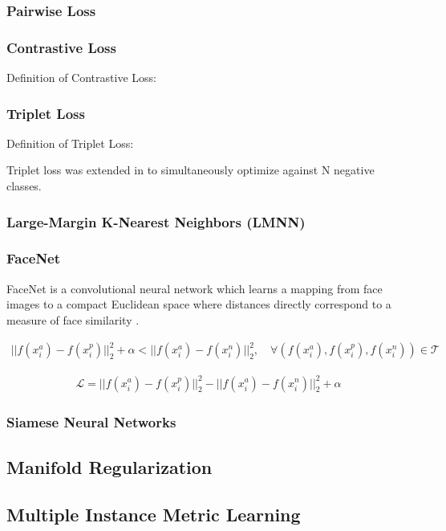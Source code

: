 	\subsubsection{Pairwise Loss}
	
	\subsubsection{Contrastive Loss}
	Definition of Contrastive Loss:
	
	
	\subsubsection{Triplet Loss}
	
	Definition of Triplet Loss:
	
	Triplet loss was extended in \citep{Sohn2016NPairLoss} to simultaneously optimize against N negative classes.

		\subsubsection{Large-Margin K-Nearest Neighbors (LMNN)}
		
		\subsubsection{FaceNet}
		
		FaceNet is a convolutional neural network which learns a mapping from face images to a compact Euclidean space where distances directly correspond to a measure of face similarity \citep{Schroff2015FaceNet}. 
		
		\begin{align}
			||f(x^{a}_{i}) - f(x^{p}_{i})||^{2}_{2} + \alpha < ||f(x^{a}_{i}) - f(x^{n}_{i})||^{2}_{2}, \quad \forall (f(x^{a}_{i}),f(x^{p}_{i}),f(x^{n}_{i})) \in \mathcal{T}
		\end{align} 
	
		\begin{align}
			\mathcal{L} = ||f(x^{a}_{i}) - f(x^{p}_{i})||^{2}_{2} -||f(x^{a}_{i}) - f(x^{n}_{i})||^{2}_{2} + \alpha
		\end{align}
		
		
		\subsubsection{Siamese Neural Networks}
	
	\subsection{Manifold Regularization}
	
	\subsection{Multiple Instance Metric Learning}



